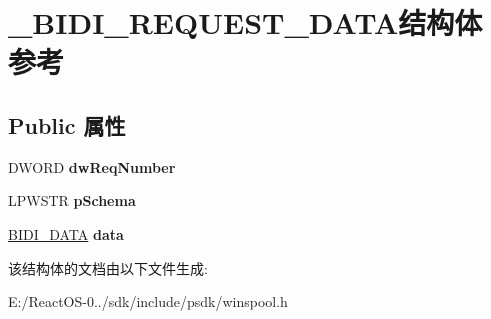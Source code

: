 \hypertarget{struct___b_i_d_i___r_e_q_u_e_s_t___d_a_t_a}{}\section{\+\_\+\+B\+I\+D\+I\+\_\+\+R\+E\+Q\+U\+E\+S\+T\+\_\+\+D\+A\+T\+A结构体 参考}
\label{struct___b_i_d_i___r_e_q_u_e_s_t___d_a_t_a}
\subsection*{Public 属性}
\begin{DoxyCompactItemize}
\item 
\mbox{\label{struct___b_i_d_i___r_e_q_u_e_s_t___d_a_t_a_a87f99cefe0634770602cddf082b4dd51}} 
D\+W\+O\+RD {\bfseries dw\+Req\+Number}
\item 
\mbox{\label{struct___b_i_d_i___r_e_q_u_e_s_t___d_a_t_a_a2aa7e6211b55cd4e172c8df24be4f014}} 
L\+P\+W\+S\+TR {\bfseries p\+Schema}
\item 
\mbox{\label{struct___b_i_d_i___r_e_q_u_e_s_t___d_a_t_a_aa131c0f8bbb8f0275aac5881ff171e5a}} 
\hyperlink{struct___b_i_d_i___d_a_t_a}{B\+I\+D\+I\+\_\+\+D\+A\+TA} {\bfseries data}
\end{DoxyCompactItemize}


该结构体的文档由以下文件生成\+:\begin{DoxyCompactItemize}
\item 
E\+:/\+React\+O\+S-\/0../sdk/include/psdk/winspool.\+h\end{DoxyCompactItemize}
